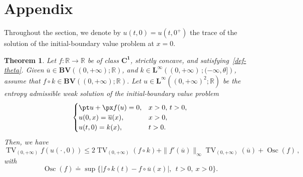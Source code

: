 \documentclass[a4paper, 10pt, final]{article}
\newtheorem{theorem}{Theorem}[section]
\newcommand{\R}{\mathbb{R}} \newcommand{\N}{\mathbb{N}}
\newcommand{\CC}[1]{\mathbf{C^{#1}}}
\DeclareMathOperator{\tv}{TV}
\DeclareMathOperator{\os}{Osc}
\begin{document}
\appendix
\section{Appendix}\label{appendix}
Throughout the section, we 
denote by $u(t,0)=u(t,0^+)$ the trace of the
solution of the initial-boundary value problem at $x=0$.
\begin{theorem}\label{bvfluxbdrytrace}
Let $f:\R\to \R$ be
of class $\CC1$, strictly concave, 
and satisfying~\eqref{def-theta}.
Given 
$\overline u\in \mathbf{BV} ((0,+\infty); \R)$,
and $k \in \mathbf{L^\infty}\left((0,+\infty)\,; (-\infty,\theta]\right)$, 
assume that $f\circ k\in \mathbf{BV} ((0,+\infty); \R)$.
Let
$u\in \mathbf{L^\infty}\left((0,+\infty)^2; \R\right)$ be the 
entropy   admissible  weak solution  of the initial-boundary value problem \begin{equation}
    \label{eq:ibvp}
    \begin{cases} 
          \pt u + \px f(u) = 0, & x >0, \, t > 0,
          \\
          u(0,x) = \overline{u}(x), & x>0,\\
          u(t,0)= k(x), & t>0.
        \end{cases}
    \end{equation}
    Then, we have
    \begin{equation}
    \label{eq:mainest}
    \tv_{(0, +\infty)} f( u(\cdot\,, 0))
    \leq
    2\tv_{(0, +\infty)} (f\circ k)
    +\|f'(\overline u)\|_\infty   \tv_{(0, +\infty)} ( \overline{u}) 
    +\os(f)\,,
    \end{equation}
    with
    \begin{equation}
    \label{eq:defosc}
       \os(f)\doteq\sup\Big\{\big| f\circ k(t) - f\circ \overline u(x)\big|,~~ t>0,\  x>0\Big\}.
    \end{equation}
\end{theorem}
%
\end{document}
